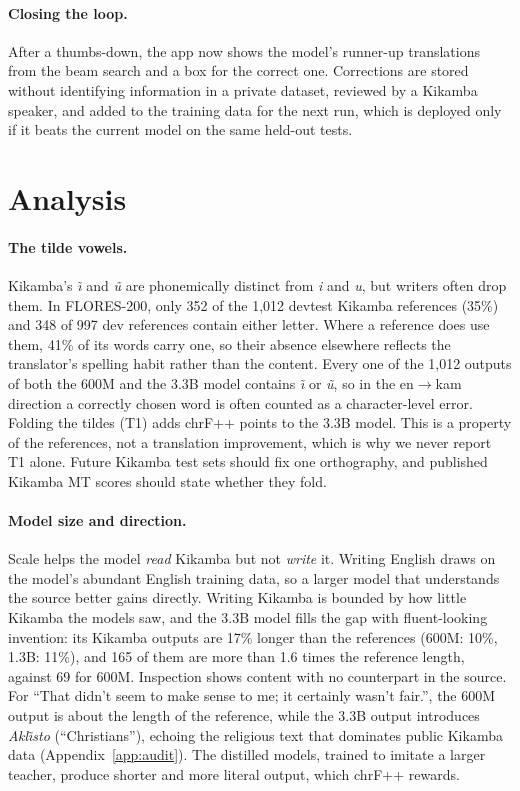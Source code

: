 \documentclass[11pt]{article}
\begin{document}
\paragraph{Closing the loop.} After a thumbs-down, the app now shows the model's runner-up translations from the beam search and a box for the correct one. Corrections are stored without identifying information in a private dataset, reviewed by a Kikamba speaker, and added to the training data for the next run, which is deployed only if it beats the current model on the same held-out tests.

\section{Analysis}
\label{sec:analysis}

\paragraph{The tilde vowels.} Kikamba's \emph{\~{\i}} and \emph{\~{u}} are phonemically distinct from \emph{i} and \emph{u}, but writers often drop them. In FLORES-200, only 352 of the 1,012 devtest Kikamba references (35\%) and 348 of 997 dev references contain either letter. Where a reference does use them, 41\% of its words carry one, so their absence elsewhere reflects the translator's spelling habit rather than the content. Every one of the 1,012 outputs of both the 600M and the 3.3B model contains \emph{\~{\i}} or \emph{\~{u}}, so in the en$\rightarrow$kam direction a correctly chosen word is often counted as a character-level error. Folding the tildes (T1) adds \mtTildeGain{} chrF++ points to the 3.3B model. This is a property of the references, not a translation improvement, which is why we never report T1 alone. Future Kikamba test sets should fix one orthography, and published Kikamba MT scores should state whether they fold.

\paragraph{Model size and direction.} Scale helps the model \emph{read} Kikamba but not \emph{write} it. Writing English draws on the model's abundant English training data, so a larger model that understands the source better gains directly. Writing Kikamba is bounded by how little Kikamba the models saw, and the 3.3B model fills the gap with fluent-looking invention: its Kikamba outputs are 17\% longer than the references (600M: 10\%, 1.3B: 11\%), and 165 of them are more than 1.6 times the reference length, against 69 for 600M. Inspection shows content with no counterpart in the source. For ``That didn't seem to make sense to me; it certainly wasn't fair.'', the 600M output is about the length of the reference, while the 3.3B output introduces \emph{Akl\~{\i}sto} (``Christians''), echoing the religious text that dominates public Kikamba data (Appendix~\ref{app:audit}). The distilled models, trained to imitate a larger teacher, produce shorter and more literal output, which chrF++ rewards.
\end{document}
